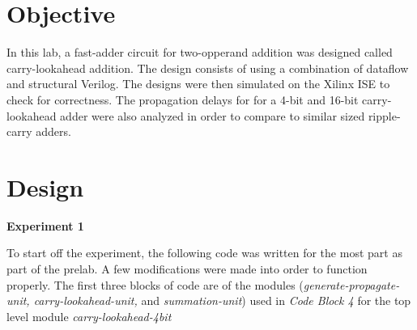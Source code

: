 \documentclass[a4paper,12pt]{article}
\begin{document}
\section*{Objective}

\hspace{15pt}In this lab, a fast-adder circuit for two-opperand addition was designed called carry-lookahead addition. The design consists of using a combination of dataflow and structural Verilog. The designs were then simulated on the Xilinx ISE to check for correctness. The propagation delays for for a 4-bit and 16-bit carry-lookahead adder were also analyzed in order to compare to similar sized ripple-carry adders.  

\section*{Design}

% 
% 
% 
% 
% 

\textbf{Experiment 1}

To start off the experiment, the following code was written for the most part as part of the prelab. A few modifications were made into order to function properly. The first three blocks of code are of the modules (\textit{generate-propagate-unit, carry-lookahead-unit,} and \textit{summation-unit}) used in \textit{Code Block 4} for the top level   module \textit{carry-lookahead-4bit}

  

  
  
  
  
\end{document}
